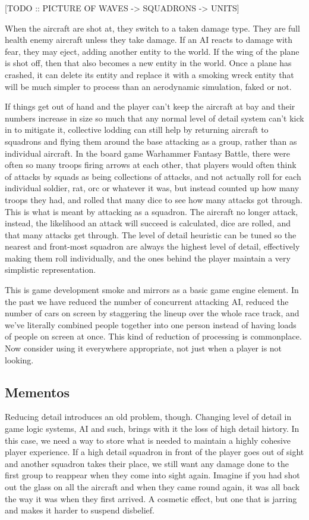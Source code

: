 \documentclass[a4paper,12pt]{article}
\begin{document}
[TODO :: PICTURE OF WAVES -> SQUADRONS -> UNITS]

When the aircraft are shot at, they switch to a taken damage type.
They are full health enemy aircraft unless they take damage.
If an AI reacts to damage with fear, they may eject, adding another entity to the world.
If the wing of the plane is shot off, then that also becomes a new entity in the world.
Once a plane has crashed, it can delete its entity and replace it with a smoking wreck entity that will be much simpler to process than an aerodynamic simulation, faked or not.

If things get out of hand and the player can't keep the aircraft at bay and their numbers increase in size so much that any normal level of detail system can't kick in to mitigate it, collective lodding can still help by returning aircraft to squadrons and flying them around the base attacking as a group, rather than as individual aircraft.
In the board game Warhammer Fantasy Battle, there were often so many troops firing arrows at each other, that players would often think of attacks by squads as being collections of attacks, and not actually roll for each individual soldier, rat, orc or whatever it was, but instead counted up how many troops they had, and rolled that many dice to see how many attacks got through.
This is what is meant by attacking as a squadron.
The aircraft no longer attack, instead, the likelihood an attack will succeed is calculated, dice are rolled, and that many attacks get through.
The level of detail heuristic can be tuned so the nearest and front-most squadron are always the highest level of detail, effectively making them roll individually, and the ones behind the player maintain a very simplistic representation.

This is game development smoke and mirrors as a basic game engine element.
In the past we have reduced the number of concurrent attacking AI, reduced the number of cars on screen by staggering the lineup over the whole race track, and we've literally combined people together into one person instead of having loads of people on screen at once.
This kind of reduction of processing is commonplace.
Now consider using it everywhere appropriate, not just when a player is not looking.

\subsection{Mementos}

Reducing detail introduces an old problem, though.
Changing level of detail in game logic systems, AI and such, brings with it the loss of high detail history.
In this case, we need a way to store what is needed to maintain a highly cohesive player experience.
If a high detail squadron in front of the player goes out of sight and another squadron takes their place, we still want any damage done to the first group to reappear when they come into sight again.
Imagine if you had shot out the glass on all the aircraft and when they came round again, it was all back the way it was when they first arrived.
A cosmetic effect, but one that is jarring and makes it harder to suspend disbelief.
\end{document}

